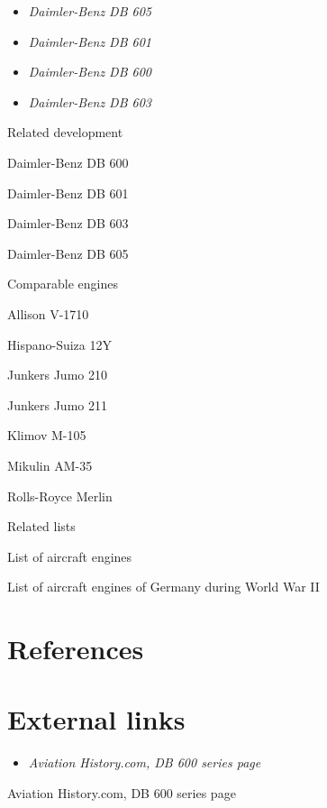 \begin{itemize}
\item
  \emph{Daimler-Benz DB 605}
\item
  \emph{Daimler-Benz DB 601}
\item
  \emph{Daimler-Benz DB 600}
\item
  \emph{Daimler-Benz DB 603}
\end{itemize}

Related development

Daimler-Benz DB 600

Daimler-Benz DB 601

Daimler-Benz DB 603

Daimler-Benz DB 605

Comparable engines

Allison V-1710

Hispano-Suiza 12Y

Junkers Jumo 210

Junkers Jumo 211

Klimov M-105

Mikulin AM-35

Rolls-Royce Merlin

Related lists

List of aircraft engines

List of aircraft engines of Germany during World War II

\section{References}\label{references}

\section{External links}\label{external-links}

\begin{itemize}
\item
  \emph{Aviation History.com, DB 600 series page}
\end{itemize}

Aviation History.com, DB 600 series page
